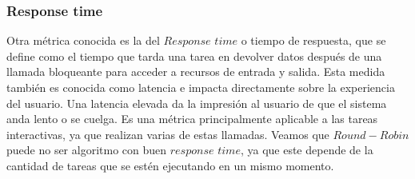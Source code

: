 % 
% 
% 
% 
%   
% 


\subsubsection{Response time}

Otra métrica conocida es la del $Response$ $time$ o tiempo de respuesta, que se define como el tiempo que tarda una tarea en devolver datos después de una llamada bloqueante para acceder a recursos de entrada y salida. Esta medida también es conocida como latencia e impacta directamente sobre la experiencia del usuario. Una latencia elevada da la impresión al usuario de que el sistema anda lento o se cuelga. Es una métrica principalmente aplicable a las tareas interactivas, ya que realizan varias de estas llamadas. Veamos que $Round-Robin$ puede no ser algoritmo con buen $response$ $time$, ya que este depende de la cantidad de tareas que se estén ejecutando en un mismo momento.

